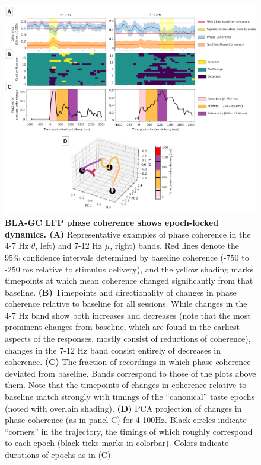 \begin{refsection}
\begin{figure}
\includegraphics[width=\linewidth]{mahmood_22_figures/fig8-0.png}
\caption{\textbf{BLA-GC LFP phase coherence shows epoch-locked dynamics. (A)} Representative examples of phase coherence in the 4-7 Hz $\theta$, left) and 7-12 Hz $\mu$, right) bands. Red lines denote the 95\% confidence intervals determined by baseline coherence (-750 to -250 ms relative to stimulus delivery), and the yellow shading marks timepoints at which mean coherence changed significantly from that baseline. \textbf{(B)} Timepoints and directionality of changes in phase coherence relative to baseline for all sessions. While changes in the 4-7 Hz band show both increases and decreases (note that the most prominent changes from baseline, which are found in the earliest aspects of the responses, mostly consist of reductions of coherence), changes in the 7-12 Hz band consist entirely of decreases in coherence. \textbf{(C)} The fraction of recordings in which phase coherence deviated from baseline. Bands correspond to those of the plots above them. Note that the timepoints of changes in coherence relative to baseline match strongly with timings of the “canonical” taste epochs (noted with overlain shading). \textbf{(D)} PCA projection of changes in phase coherence (as in panel C) for 4-100Hz. Black circles indicate “corners” in the trajectory, the timings of which roughly correspond to each epoch (black ticks marks in colorbar). Colors indicate durations of epochs as in (C).}
\label{fig:wrapfig}
\end{figure}


\end{refsection}
